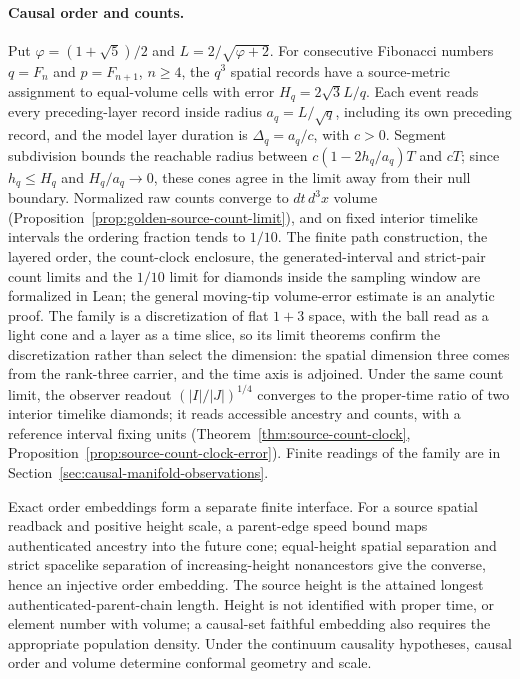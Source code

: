 \documentclass[11pt]{article}
\begin{document}
\paragraph{Causal order and counts.}
Put $\varphi=(1+\sqrt5)/2$ and $L=2/\sqrt{\varphi+2}$. For consecutive
Fibonacci numbers $q=F_n$ and $p=F_{n+1}$, $n\geq4$, the $q^3$ spatial records
have a source-metric assignment to equal-volume cells with error
$H_q=2\sqrt3L/q$. Each event reads every preceding-layer record inside radius
$a_q=L/\sqrt q$, including its own preceding record, and the model layer
duration is $\Delta_q=a_q/c$, with $c>0$. Segment subdivision bounds the
reachable radius between $c(1-2h_q/a_q)T$ and $cT$; since $h_q\leq H_q$ and
$H_q/a_q\to0$, these cones agree in the limit away from their null boundary.
Normalized raw counts converge to $dt\,d^3x$ volume
(Proposition~\ref{prop:golden-source-count-limit}), and on fixed interior
timelike intervals the ordering fraction tends to $1/10$. The finite path
construction, the layered order, the count-clock enclosure, the
generated-interval and strict-pair count limits and the $1/10$ limit for
diamonds inside the sampling window are formalized in Lean; the general
moving-tip volume-error estimate is an analytic proof. The family is a
discretization of flat $1+3$ space, with the ball read as a light cone and a
layer as a time slice, so its limit theorems confirm the discretization rather
than select the dimension: the spatial dimension three comes from the
rank-three carrier, and the time axis is adjoined. Under the same count limit,
the observer readout $(|I|/|J|)^{1/4}$ converges to the proper-time ratio of
two interior timelike diamonds; it reads accessible ancestry and counts, with
a reference interval fixing units
(Theorem~\ref{thm:source-count-clock},
Proposition~\ref{prop:source-count-clock-error}). Finite readings of the
family are in Section~\ref{sec:causal-manifold-observations}.

Exact order embeddings form a separate finite interface. For a source spatial
readback and positive height scale, a parent-edge speed bound maps
authenticated ancestry into the future cone; equal-height spatial separation
and strict spacelike separation of increasing-height nonancestors give the
converse, hence an injective order embedding. The source height is the
attained longest authenticated-parent-chain length. Height is not identified
with proper time, or element number with volume; a causal-set faithful
embedding also requires the appropriate population
density\cite{bombelli1987,surya2019}. Under the continuum causality
hypotheses, causal order and volume determine conformal geometry and
scale\cite{hawkingkingmccarthy1976,malament1977}.
\end{document}
